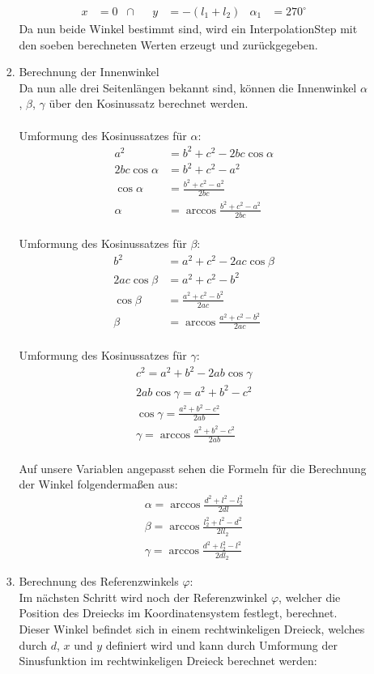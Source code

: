 \begin{itemize}
\begin{enumerate}
\begin{enumerate}
\begin{align*}
x & = 0 &\cap && y & = -(l_1+l_2) & \alpha_1 & = 270^\circ
\end{align*}
Da nun beide Winkel bestimmt sind, wird ein InterpolationStep mit den soeben berechneten Werten erzeugt und zurückgegeben.
\item Berechnung der Innenwinkel\\
Da nun alle drei Seitenlängen bekannt sind, können die Innenwinkel $\alpha$, $\beta$, $\gamma$ über den Kosinussatz berechnet werden.\\
\\
Umformung des Kosinussatzes für $\alpha$:
\begin{align*}
a^2 & = b^2 + c^2 - 2bc \cos \alpha \\
2bc \cos \alpha & = b^2 + c^2 - a^2 \\
\cos \alpha & = \frac{b^2 + c^2 - a^2}{2bc} \\
\alpha & = \arccos \frac{b^2 + c^2 - a^2}{2bc}
\end{align*}
\\
Umformung des Kosinussatzes für $\beta$:
\begin{align*}
b^2 & = a^2 + c^2 - 2ac \cos \beta \\
2ac \cos \beta & = a^2 + c^2 - b^2 \\
\cos \beta & = \frac{a^2 + c^2 - b^2}{2ac} \\
\beta & = \arccos \frac{a^2 + c^2 - b^2}{2ac}
\end{align*}
\\
Umformung des Kosinussatzes für $\gamma$:
\begin{align*}
c^2 = a^2 + b^2 - 2ab \cos \gamma \\
2ab \cos \gamma = a^2 + b^2 - c^2 \\
\cos \gamma = \frac{a^2 + b^2 - c^2}{2ab} \\
\gamma = \arccos \frac{a^2 + b^2 - c^2}{2ab}
\end{align*}
\\
Auf unsere Variablen angepasst sehen die Formeln für die Berechnung der Winkel folgendermaßen aus:
\begin{align*}
\alpha = \arccos \frac{d^2 + l^2 - l_2^2}{2dl} \\
\beta = \arccos \frac{l_2^2 + l^2 - d^2}{2ll_2} \\
\gamma = \arccos \frac{d^2 + l_2^2 - l^2}{2dl_2}
\end{align*}
\item Berechnung des Referenzwinkels $\varphi$:\\
Im nächsten Schritt wird noch der Referenzwinkel $\varphi$, welcher die Position des Dreiecks im Koordinatensystem festlegt, berechnet. Dieser Winkel befindet sich in einem rechtwinkeligen Dreieck, welches durch $d$, $x$ und $y$ definiert wird und kann durch Umformung der Sinusfunktion im rechtwinkeligen Dreieck berechnet werden:

\end{enumerate}
\end{enumerate}
\end{itemize}
